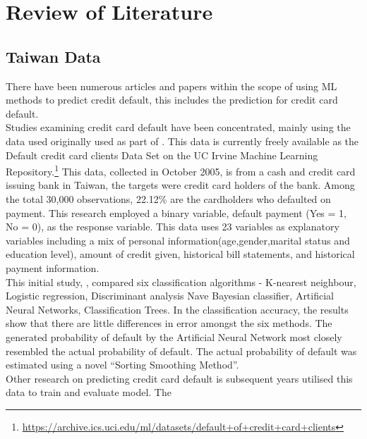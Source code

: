 \documentclass[
]{article}
\author{}
\date{\vspace{-2.5em}}
\begin{document}

\hypertarget{review-of-literature}{%
\section{Review of Literature}\label{review-of-literature}}

\hypertarget{taiwan-data}{%
\subsection{Taiwan Data}\label{taiwan-data}}

There have been numerous articles and papers within the scope of using
ML methods to predict credit default, this includes the prediction for
credit card default.\\
\vspace{.5 cm} Studies examining credit card default have been
concentrated, mainly using the data used originally used as part of
\citet{YEH20092473} . This data is currently freely available as the
Default credit card clients Data Set on the UC Irvine Machine Learning
Repository.\footnote{\url{https://archive.ics.uci.edu/ml/datasets/default+of+credit+card+clients}}
This data, collected in October 2005, is from a cash and credit card
issuing bank in Taiwan, the targets were credit card holders of the
bank. Among the total 30,000 observations, 22.12\% are the cardholders
who defaulted on payment. This research employed a binary variable,
default payment (Yes = 1, No = 0), as the response variable. This data
uses 23 variables as explanatory variables including a mix of personal
information(age,gender,marital status and education level), amount of
credit given, historical bill statements, and historical payment
information.\\
This initial study, \citet{YEH20092473}, compared six classification
algorithms - K-nearest neighbour, Logistic regression, Discriminant
analysis Nave Bayesian classifier, Artificial Neural Networks,
Classification Trees. In the classification accuracy, the results show
that there are little differences in error amongst the six methods. The
generated probability of default by the Artificial Neural Network most
closely resembled the actual probability of default. The actual
probability of default was estimated using a novel ``Sorting Smoothing
Method''.\\
\vspace{.5 cm} Other research on predicting credit card default is
subsequent years utilised this data to train and evaluate model. The
\end{document}
